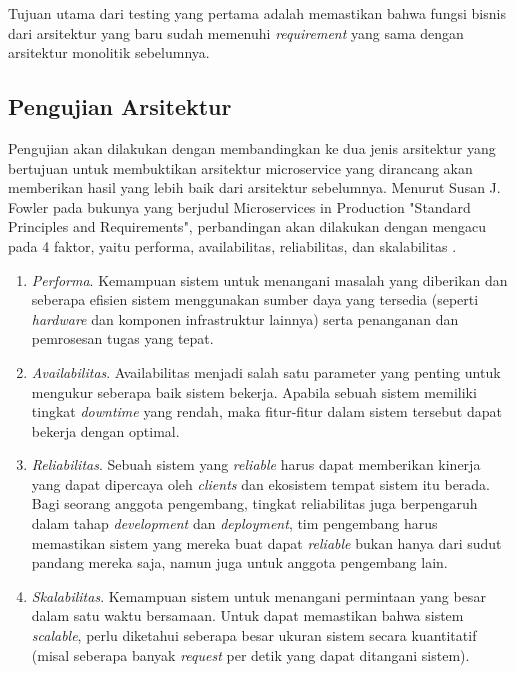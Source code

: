 Tujuan utama dari testing yang pertama adalah memastikan bahwa fungsi bisnis dari arsitektur yang baru sudah memenuhi \textit{requirement} yang sama dengan arsitektur monolitik sebelumnya.
\subsection{Pengujian Arsitektur}
Pengujian akan dilakukan dengan membandingkan ke dua jenis arsitektur yang bertujuan untuk membuktikan arsitektur microservice yang dirancang akan memberikan hasil yang lebih baik dari arsitektur sebelumnya. Menurut Susan J. Fowler pada bukunya yang berjudul Microservices in Production "Standard Principles and Requirements", perbandingan akan dilakukan dengan mengacu pada 4 faktor, yaitu performa, availabilitas, reliabilitas, dan skalabilitas \cite{10} .
\begin{enumerate}[leftmargin=*]
	\item \textit{Performa}. Kemampuan sistem untuk menangani masalah yang diberikan dan seberapa efisien sistem menggunakan sumber daya yang tersedia (seperti \textit{hardware} dan komponen infrastruktur lainnya) serta penanganan dan pemrosesan tugas yang tepat. 
	\item \textit{Availabilitas}. Availabilitas menjadi salah satu parameter yang penting untuk mengukur seberapa baik sistem bekerja. Apabila sebuah sistem memiliki tingkat \textit{downtime} yang rendah, maka fitur-fitur dalam sistem tersebut dapat bekerja dengan optimal.
	\item \textit{Reliabilitas}. Sebuah sistem yang \textit{reliable} harus dapat memberikan kinerja yang dapat dipercaya oleh \textit{clients} dan ekosistem tempat sistem itu berada. Bagi seorang anggota pengembang, tingkat reliabilitas juga berpengaruh dalam tahap \textit{development} dan \textit{deployment}, tim pengembang harus memastikan sistem yang mereka buat dapat \textit{reliable} bukan hanya dari sudut pandang mereka saja, namun juga untuk anggota pengembang lain.
	\item \textit{Skalabilitas}. Kemampuan sistem untuk menangani permintaan yang besar dalam satu waktu bersamaan. Untuk dapat memastikan bahwa sistem \textit{scalable}, perlu diketahui seberapa besar ukuran sistem secara kuantitatif (misal seberapa banyak \textit{request} per detik yang dapat ditangani sistem).
\end{enumerate}
